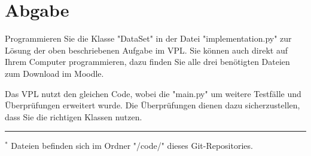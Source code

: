 \documentclass[]{article}
\begin{document}
\section{Abgabe}
Programmieren Sie die Klasse "DataSet" in der Datei "implementation.py" zur Lösung der oben beschriebenen Aufgabe im VPL.
Sie können auch direkt auf Ihrem Computer programmieren, dazu finden Sie alle drei benötigten Dateien zum Download im Moodle.

Das VPL nutzt den gleichen Code, wobei die "main.py" um weitere Testfälle und Überprüfungen erweitert wurde.
Die Überprüfungen dienen dazu sicherzustellen, dass Sie die richtigen Klassen nutzen.

\hrule
\vspace{0.2cm}
$^*$ Dateien befinden sich im Ordner "/code/" dieses Git-Repositories.
\end{document}
